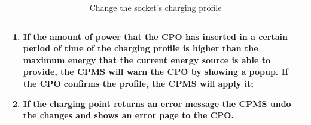 \documentclass{Configuration_Files/PoliMi3i_thesis}
\begin{document}
\begin{table}[H]
\begin{tabularx}{\textwidth}{| >{\columncolor{bluepoli!40}}l | X |}
\begin{enumerate}
        \item If the amount of power that the CPO has inserted in a certain period of time of the charging profile is higher than the maximum energy that the current energy source is able to provide, the CPMS will warn the CPO by showing a popup. If the CPO confirms the profile, the CPMS will apply it;
        \item If the charging point returns an error message the CPMS undo the changes and shows an error page to the CPO.
        \end{enumerate}\B\\
    \hline
    \end{tabularx}
    \\[10pt]
    \caption{Change the socket’s charging profile}
    \label{table:example}
\end{table}

\end{document}
